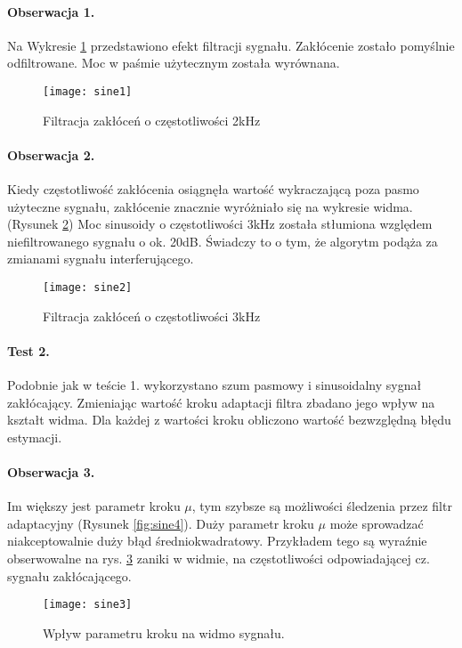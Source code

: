 \paragraph{Obserwacja 1.}
Na Wykresie \ref{fig:sine1} przedstawiono efekt filtracji sygnału.
Zakłócenie  zostało pomyślnie odfiltrowane.
Moc w paśmie użytecznym została wyrównana.

\begin{figure}[ht]
\centering
\texttt{[image: sine1]}
\caption{Filtracja zakłóceń o częstotliwości 2kHz}
\label{fig:sine1}
\end{figure}

\paragraph{Obserwacja 2.}
Kiedy częstotliwość zakłócenia osiągnęła wartość wykraczającą poza pasmo użyteczne sygnału, zakłócenie znacznie wyróżniało się na wykresie widma. (Rysunek \ref{fig:sine2})
Moc sinusoidy o częstotliwości 3kHz została stłumiona względem niefiltrowanego sygnału o ok. 20dB.
Świadczy to o tym, że algorytm podąża za zmianami sygnału interferującego.

\begin{figure}[ht]
\centering
\texttt{[image: sine2]}
\caption{Filtracja zakłóceń o częstotliwości 3kHz}
\label{fig:sine2}
\end{figure}

\paragraph{Test 2.}
Podobnie jak w teście 1. wykorzystano szum pasmowy i sinusoidalny sygnał zakłócający.
Zmieniając wartość kroku adaptacji filtra zbadano jego wpływ na kształt widma.
Dla każdej z wartości kroku obliczono wartość bezwzględną błędu estymacji.

\paragraph{Obserwacja 3.}
Im większy jest parametr kroku $\mu$, tym szybsze są możliwości śledzenia przez filtr adaptacyjny (Rysunek \ref{fig:sine4}). Duży parametr kroku $\mu$ może sprowadzać niakceptowalnie duży błąd średniokwadratowy. \cite{Haykin:1998:ST} 
Przykładem tego są wyraźnie obserwowalne na rys. \ref{fig:sine3} zaniki w widmie, na częstotliwości odpowiadającej cz. sygnału zakłócającego.

\begin{figure}[ht]
\centering
\texttt{[image: sine3]}
\caption{Wpływ parametru kroku na widmo sygnału.}
\label{fig:sine3}
\end{figure}

